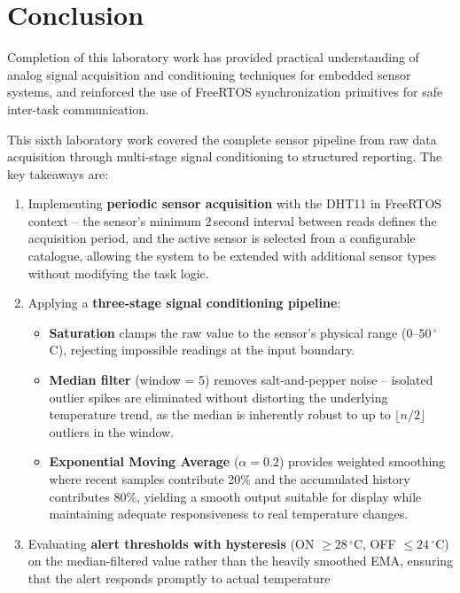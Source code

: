 \section{Conclusion}

Completion of this laboratory work has provided practical understanding of analog signal
acquisition and conditioning techniques for embedded sensor systems, and reinforced the
use of FreeRTOS synchronization primitives for safe inter-task communication.

This sixth laboratory work covered the complete sensor pipeline from raw data acquisition
through multi-stage signal conditioning to structured reporting. The key takeaways are:

\begin{enumerate}
  \item Implementing \textbf{periodic sensor acquisition} with the DHT11 in FreeRTOS
    context -- the sensor's minimum 2\,second interval between reads defines the
    acquisition period, and the active sensor is selected from a configurable catalogue,
    allowing the system to be extended with additional sensor types without modifying
    the task logic.
  \item Applying a \textbf{three-stage signal conditioning pipeline}:
    \begin{itemize}
      \item \textbf{Saturation} clamps the raw value to the sensor's physical range
        ($0$--$50\,^\circ$C), rejecting impossible readings at the input boundary.
      \item \textbf{Median filter} (window = 5) removes salt-and-pepper noise --
        isolated outlier spikes are eliminated without distorting the underlying
        temperature trend, as the median is inherently robust to up to
        $\lfloor n/2 \rfloor$ outliers in the window.
      \item \textbf{Exponential Moving Average} ($\alpha = 0.2$) provides weighted
        smoothing where recent samples contribute 20\% and the accumulated history
        contributes 80\%, yielding a smooth output suitable for display while
        maintaining adequate responsiveness to real temperature changes.
    \end{itemize}
  \item Evaluating \textbf{alert thresholds with hysteresis} (ON $\geq 28\,^\circ$C,
    OFF $\leq 24\,^\circ$C) on the median-filtered value rather than the heavily
    smoothed EMA, ensuring that the alert responds promptly to actual temperature

\end{enumerate}
